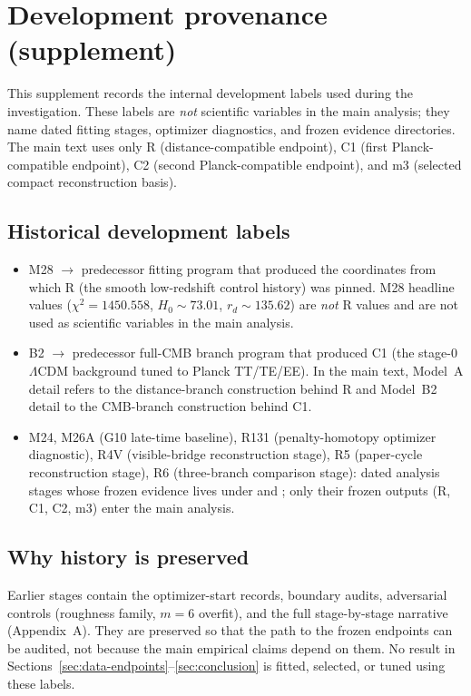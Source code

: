 \section{Development provenance (supplement)}
\label{sec:development-provenance}

This supplement records the internal development labels used during
the investigation. These labels are \emph{not} scientific variables
in the main analysis; they name dated fitting stages, optimizer
diagnostics, and frozen evidence directories. The main text uses only
R (distance-compatible endpoint), C1 (first Planck-compatible
endpoint), C2 (second Planck-compatible endpoint), and m3 (selected
compact reconstruction basis).

\subsection{Historical development labels}

\begin{itemize}
\item M28 $\to$ predecessor fitting program that produced the
coordinates from which R (the smooth low-redshift control history)
was pinned. M28 headline values ($\chi^{2}=1450.558$,
$H_{0}\sim73.01$, $r_{d}\sim135.62$) are \emph{not} R values and are
not used as scientific variables in the main analysis.
\item B2 $\to$ predecessor full-CMB branch program that produced C1
(the stage-0 $\Lambda$CDM background tuned to Planck TT/TE/EE).
In the main text, Model~A detail refers to the distance-branch
construction behind R and Model~B2 detail to the CMB-branch
construction behind C1.
\item M24, M26A (G10 late-time baseline), R131 (penalty-homotopy
optimizer diagnostic), R4V (visible-bridge reconstruction stage),
R5 (paper-cycle reconstruction stage), R6 (three-branch comparison
stage): dated analysis stages whose frozen evidence lives under
 and ;
only their frozen outputs (R, C1, C2, m3) enter the main analysis.
\end{itemize}

\subsection{Why history is preserved}

Earlier stages contain the optimizer-start records, boundary audits,
adversarial controls (roughness family, $m=6$ overfit), and the
full stage-by-stage narrative (Appendix~A). They are preserved so
that the path to the frozen endpoints can be audited, not because
the main empirical claims depend on them. No result in
Sections~\ref{sec:data-endpoints}--\ref{sec:conclusion} is fitted,
selected, or tuned using these labels.

